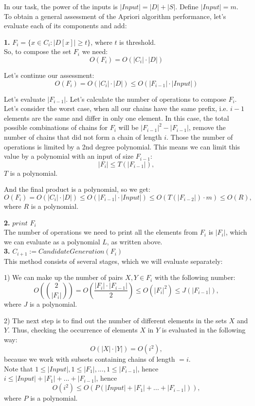 \documentclass{article}
\begin{document}
  In our task, the power of the inputs is $|Input| = |D| + |S|$. Define $|Input| = m$.\\

  To obtain a general assessment of the Apriori algorithm performance, let's evaluate each of its components and add:

  \textbf{1.} $F_{i} = \{x \in C_{i}: |D[x]| \geq t\}$, where $t$ is threshold. \\
  So, to compose the set $F_{i}$ we need:
  $$O(F_{i}) = O(|C_{i}| \cdot |D|)$$

  Let's continue our assessment:
  $$O(F_{i}) = O(|C_{i}| \cdot |D|) \leq O(|F_{i-1}| \cdot |Input|)$$

  Let's evaluate $|F_{i-1}|$. Let's calculate the number of operations to compose $F_{i}$. Let's consider the worst case, when all our chains have the same prefix, i.e. $i-1$ elements are the same and differ in only one element. In this case, the total possible combinations of chains for $F_{i}$ will be $|F_{i-1}|^2 - |F_{i-1}|$, remove the number of chains that did not form a chain of length $i$. Those the number of operations is limited by a 2nd degree polynomial. This means we can limit this value by a polynomial with an input of size $F_{i-1}$:
  $$|F_{i}| \leq T(|F_{i-1}|),$$ $T$ is a polynomial.

  And the final product is a polynomial, so we get:
  $$O(F_{i}) = O(|C_{i}| \cdot |D|) \leq O(|F_{i-1}| \cdot |Input|) \leq O(T(|F_{i-2}|) \cdot m) \leq O(R),$$ where $R$ is a polynomial.

  \textbf{2.} $print$ $F_{i}$ \\
  The number of operations we need to print all the elements from $F_{i}$ is $|F_{i}|$, which we can evaluate as a polynomial $L$, as written above.\\

  \textbf{3.} $C_{i+1} := CandidateGeneration(F_{i})$ \\
  This method consists of several stages, which we will evaluate separately:

  1) We can make up the number of pairs $X, Y \in F_{i}$ with the following number:
  $$O \left( \binom {2} {|F_{i}|}\right) = O\left(\frac{|F_{i}| \cdot |F_{i-1}|}{2}\right) \leq O(|F_{i}|^2) \leq J(|F_{i-1}|),$$ where $J$ is a polynomial.

  2) The next step is to find out the number of different elements in the sets $X$ and $Y$. Thus, checking the occurrence of elements $X$ in $Y$ is evaluated in the following way:
  $$O(|X| \cdot |Y|) = O(i^2),$$
  because we work with subsets containing chains of length $= i$. \\
  Note that $1 \leq |Input|, 1 \leq |F_{1}|, ... , 1 \leq |F_{i-1}|$, hence $i \leq |Input| + |F_{1}| + ... + |F_{i-1}|$, hence
  $$O(i^2) \leq O(P(|Input| + |F_{1}| + ... + |F_{i-1}|)),$$ where $P$ is a polynomial.
\end{document}
